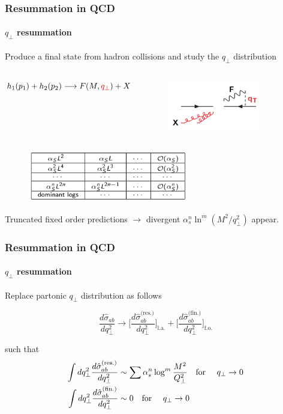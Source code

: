 \documentclass[aspectratio=43]{beamer}
\begin{document}
\begin{frame}

	\frametitle{Resummation in QCD}
	\framesubtitle{$q_{\perp}$ resummation}
	
	Produce a final state from hadron collisions and study the $q_{\perp}$ distribution 
	
	\begin{columns}
	
	$h_{1}(p_{1}) + h_{2}(p_{2}) \longrightarrow F(M, {\color{red}q_{\perp}}) + X$

	
	\begin{figure}
		\includegraphics[width = 4cm]{plots/qT_diagram.png}
	\end{figure}

	\end{columns}

	\begin{figure}
		\includegraphics[width = 7cm]{plots/qT_logs_table.png}
	\end{figure}

	Truncated fixed order predictions $\rightarrow$ {\color{red}divergent $\alpha_{s}^{n}\ln^{m}(M^{2}/q_{\perp}^{2})$ appear}.

\end{frame}

\begin{frame}

	\frametitle{Resummation in QCD}
	\framesubtitle{$q_{\perp}$ resummation}

	Replace partonic $q_{\perp}$ distribution as follows
	
	\begin{equation}
		\frac{d\hat{\sigma}_{ab}}{dq_{\perp}^{2}} \rightarrow 
		\Bigg[ \frac{d\hat{\sigma}^{\textrm{(res.)}}_{ab}}{dq_{\perp}^{2}} \Bigg]_{\textrm{l.a.}} + 
		\Bigg[ \frac{d\hat{\sigma}^{\textrm{(fin.)}}_{ab}}{dq_{\perp}^{2}} \Bigg]_{\textrm{f.o.}} \nonumber
	\end{equation}

	such that
	\begin{align}
		\int dq_{\perp}^{2} \frac{d\hat{\sigma}^{\textrm{(res.)}}_{ab}}{dq_{\perp}^{2}} &\sim \sum \alpha_{s}^{n} \log^{m} \frac{M^{2}}{Q_{\perp}^{2}} \textrm{\quad for \quad} q_{\perp} \rightarrow 0 \nonumber \\
		\int dq_{\perp}^{2} \frac{d\hat{\sigma}^{\textrm{(fin.)}}_{ab}}{dq_{\perp}^{2}} &\sim 0 \nonumber \textrm{\quad for \quad} q_{\perp} \rightarrow 0
	\end{align}

\end{frame}
\end{document}
